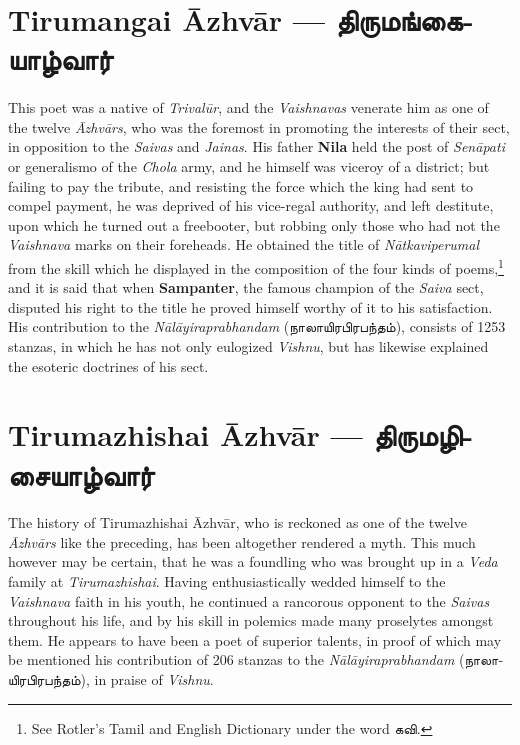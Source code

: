 \documentclass{article}
\newcommand{\TamilText}[1]{\texttamil{#1}}
\newcommand{\TamilBold}[1]{\texttamil{\textbf{#1}}}
\newcommand{\tam}[1]{\TamilText{#1}}
\newcommand{\tambold}[1]{\TamilBold{#1}}
\begin{document}
\section{Tirumangai \={A}zhv\={a}r --- \tambold{திருமங்கையாழ்வார்}}
\paragraph{}
This poet was a native of \emph{Trival\={u}r}, and the \emph{Vaishnavas} venerate him as one of the twelve \emph{\={A}zhv\={a}rs}, who was the foremost in promoting the interests of their sect, in opposition to the \emph{Saivas} and \emph{Jainas}. His father \textbf{Nila} held the post of \emph{Sen\={a}pati} or generalismo of the \emph{Chola} army, and he himself was viceroy of a district; but failing to pay the tribute, and resisting the force which the king had sent to compel payment, he was deprived of his vice-regal authority, and left destitute, upon which he turned out a freebooter, but robbing only those who had not the \emph{Vaishnava} marks on their foreheads. He obtained the title of \emph{N\={a}tkaviperumal} from the skill which he displayed in the composition of the four kinds of poems,\footnote{See Rotler's Tamil and English Dictionary under the word \tam{கவி}.} and it is said that when \textbf{Sampanter}, the famous champion of the \emph{Saiva} sect, disputed his right to the title he proved himself worthy of it to his satisfaction. His contribution to the \emph{N\={a}l\={a}yiraprabhandam} (\tam{நாலாயிரபிரபந்தம்}), consists of 1253 stanzas, in which he has not only eulogized \emph{Vishnu}, but has likewise explained the esoteric doctrines of his sect.

\section{Tirumazhishai \={A}zhv\={a}r --- \tambold{திருமழிசையாழ்வார்}}
\paragraph{}
The history of Tirumazhishai \={A}zhv\={a}r, who is reckoned as one of the twelve \emph{\={A}zhv\={a}rs} like the preceding, has been altogether rendered a myth. This much however may be certain, that he was a foundling who was brought up in a \emph{Veda} family at \emph{Tirumazhishai}. Having enthusiastically wedded himself to the \emph{Vaishnava} faith in his youth, he continued a rancorous opponent to the \emph{Saivas} throughout his life, and by his skill in polemics made many proselytes amongst them. He appears to have been a poet of superior talents, in proof of which may be mentioned his contribution of 206 stanzas to the \emph{N\={a}l\={a}yiraprabhandam} (\tam{நாலாயிரபிரபந்தம்}), in praise of \emph{Vishnu}.
\end{document}
